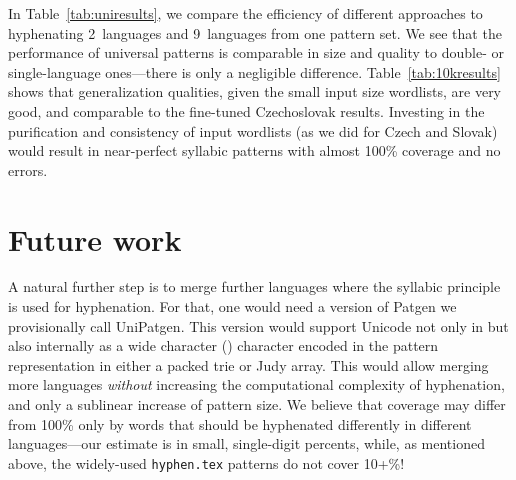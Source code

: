 \documentclass{csbulletin}
\let\program=\textrm %
\let\file=\texttt
\let\acro\relax
\providecommand\Dash{---}
\newcommand{\Patgen}{\program{Patgen}\xspace}
\newcommand{\XPatgen}{\program{UniPatgen}\xspace}
\begin{document}
In Table~\ref{tab:uniresults}, we compare the efficiency of different approaches to hyphenating 2~languages and 9~languages from one pattern set.
We see that the performance of universal patterns is comparable in size and quality to double- or single-language ones\Dash there is only a negligible difference.
Table~\ref{tab:10kresults} shows that generalization qualities, given the small input size wordlists, are very good, and comparable to the fine-tuned Czechoslovak results.
Investing in the purification and consistency of input wordlists (as we did for Czech and Slovak) would result in near-perfect syllabic patterns with almost 100\% coverage and no errors.  

 
\section{Future work} %
\label{sec:future}

A natural further step is to merge further languages where the syllabic principle is used for hyphenation.  
For that, one would need a version of \Patgen we provisionally call \XPatgen. 
This version would support Unicode not only in \acro{I/O} but also internally as a wide character (\mbox{\acro{UTF-16}}) character encoded in the pattern representation in either a packed trie or Judy array.
This would allow merging more languages \emph{without} increasing the computational complexity of hyphenation, and only a sublinear increase of pattern size.
We believe that coverage may differ from 100\% only by words that should be hyphenated differently in different languages\Dash our estimate is in small, single-digit percents, while, as mentioned above, the widely-used \file{hyphen.tex} patterns do not cover 10+\%!
\end{document}
